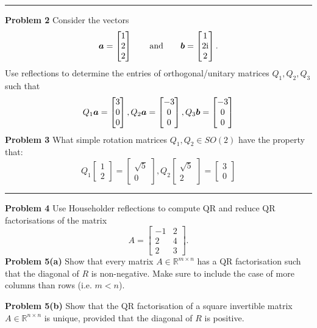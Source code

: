 \documentclass[12pt,a4paper]{article}
\def\bbR{ {\mathbb R} }
\def\a{ {\vc a} }
\def\b{ {\vc b} }
\begin{document}
\rule{\textwidth}{1pt}
\textbf{Problem 2} Consider the vectors
\[
\ensuremath{\bm{\a}} = \begin{bmatrix} 1 \\ 2 \\ 2 \end{bmatrix}\qquad\hbox{and}\qquad  \ensuremath{\bm{\b}} = \begin{bmatrix} 1 \\ 2{\rm i} \\ 2 \end{bmatrix}.
\]
Use reflections to determine the entries of orthogonal/unitary matrices $Q_1, Q_2, Q_3$ such that
\[
Q_1 \ensuremath{\bm{\a}} = \begin{bmatrix} 3 \\ 0 \\ 0 \end{bmatrix}, Q_2 \ensuremath{\bm{\a}} = \begin{bmatrix} -3 \\ 0 \\ 0 \end{bmatrix},
Q_3 \ensuremath{\bm{\b}} = \begin{bmatrix} -3 \\ 0 \\ 0 \end{bmatrix}
\]
\textbf{Problem 3} What simple rotation matrices $Q_1,Q_2 \ensuremath{\in} SO(2)$ have the property that:
\[
Q_1 \begin{bmatrix} 1 \\ 2 \end{bmatrix} =\begin{bmatrix} \sqrt{5} \\ 0 \end{bmatrix},  Q_2 \begin{bmatrix} \sqrt{5} \\ 2 \end{bmatrix} =  \begin{bmatrix} 3 \\ 0 \end{bmatrix}
\]
\rule{\textwidth}{1pt}
\textbf{Problem 4} Use Householder reflections to compute QR and reduce QR factorisations of the matrix
\[
A = \begin{bmatrix} -1 & 2 \\ 
2 & 4 \\ 
2 & 3 \end{bmatrix}.
\]
\textbf{Problem 5(a)} Show that every matrix $A \ensuremath{\in} \ensuremath{\bbR}^{m \ensuremath{\times} n}$ has a  QR factorisation such that the diagonal of $R$ is non-negative. Make sure to include the case of more columns than rows (i.e. $m < n$). 

\textbf{Problem 5(b)} Show that the QR factorisation of a square invertible matrix $A \ensuremath{\in} \ensuremath{\bbR}^{n \ensuremath{\times} n}$ is unique, provided that the diagonal of $R$ is positive.
\end{document}
